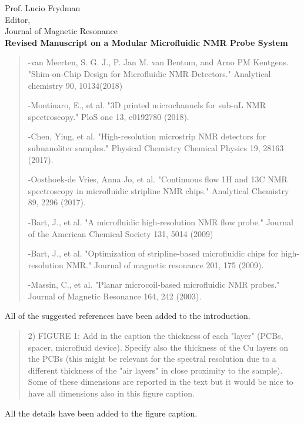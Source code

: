 \documentclass{mu-soton-letter}
\newenvironment{reviewer} {\begin{quote}\color{black!50}} {\end{quote}}
\begin{document}
\begin{letter}{Prof. Lucio Frydman\\
  Editor,\\
  Journal of Magnetic Resonance\\[2cm]
  \textbf{Revised Manuscript on a Modular Microfluidic NMR Probe System}}
\begin{reviewer}

-van Meerten, S. G. J., P. Jan M. van Bentum, and Arno PM Kentgens. "Shim-on-Chip Design for Microfluidic NMR Detectors." Analytical chemistry 90, 10134(2018)


-Montinaro, E., et al. "3D printed microchannels for sub-nL NMR spectroscopy." PloS one 13, e0192780 (2018).


-Chen, Ying, et al. "High-resolution microstrip NMR detectors for subnanoliter samples." Physical Chemistry Chemical Physics 19, 28163 (2017).


-Oosthoek-de Vries, Anna Jo, et al. "Continuous flow 1H and 13C NMR spectroscopy in microfluidic stripline NMR chips." Analytical Chemistry 89,  2296 (2017).


-Bart, J., et al. "A microfluidic high-resolution NMR flow probe." Journal of the American Chemical Society 131, 5014 (2009)


-Bart, J., et al. "Optimization of stripline-based microfluidic chips for high-resolution NMR." Journal of magnetic resonance 201, 175 (2009).


-Massin, C., et al. "Planar microcoil-based microfluidic NMR probes." Journal of Magnetic Resonance 164, 242 (2003).

\end{reviewer}
All of the suggested references have been added to the introduction.

\begin{reviewer}
2) FIGURE 1: Add in the caption the thickness of each "layer" (PCBs, spacer, microfluid device). Specify also the thickness of the Cu layers on the PCBs (this might be relevant for the spectral resolution due to a different thickness of the "air layers" in close proximity to the sample). Some of these dimensions are reported in the text but it would be nice to have all dimensions also in this figure caption.
\end{reviewer}
All the details have been added to the figure caption.


\end{letter}
\end{document}
